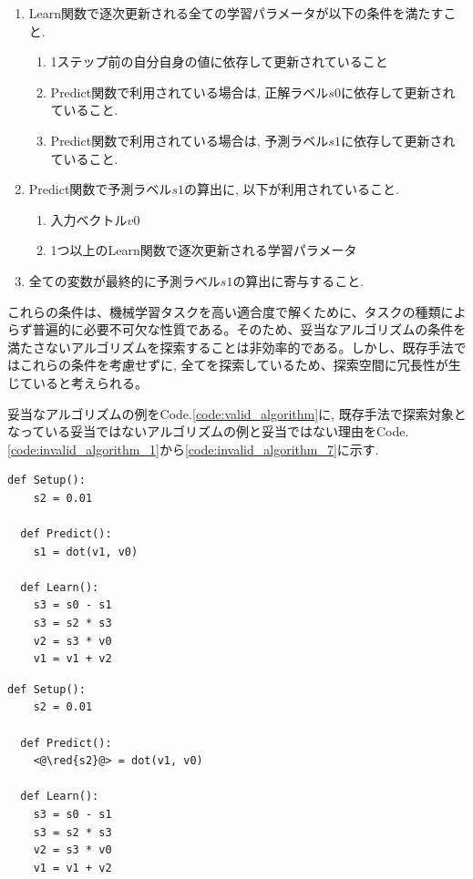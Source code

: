 \documentclass[11pt,oneside,openany,report]{jsbook}
\newcommand{\red}[1]{\textcolor{red}{#1}}
\begin{document}
\begin{enumerate}
  \item Learn関数で逐次更新される全ての学習パラメータが以下の条件を満たすこと.
  \begin{enumerate}
    \item 1ステップ前の自分自身の値に依存して更新されていること
    \item Predict関数で利用されている場合は, 正解ラベル$s0$に依存して更新されていること.
    \item Predict関数で利用されている場合は, 予測ラベル$s1$に依存して更新されていること.
  \end{enumerate}
  \item Predict関数で予測ラベル$s1$の算出に, 以下が利用されていること.
  \begin{enumerate}
    \item 入力ベクトル$v0$
    \item 1つ以上のLearn関数で逐次更新される学習パラメータ
  \end{enumerate}
  \item 全ての変数が最終的に予測ラベル$s1$の算出に寄与すること.
\end{enumerate}

これらの条件は、機械学習タスクを高い適合度で解くために、タスクの種類によらず普遍的に必要不可欠な性質である。そのため、妥当なアルゴリズムの条件を満たさないアルゴリズムを探索することは非効率的である。しかし、既存手法ではこれらの条件を考慮せずに, 全てを探索しているため、探索空間に冗長性が生じていると考えられる。

妥当なアルゴリズムの例をCode.\ref{code:valid_algorithm}に, 既存手法で探索対象となっている妥当ではないアルゴリズムの例と妥当ではない理由をCode.\ref{code:invalid_algorithm_1}から\ref{code:invalid_algorithm_7}に示す.

\newpage

\begin{multicols}{2}
  \begin{lstlisting}[caption=妥当な機械学習アルゴリズムの例,label=code:valid_algorithm]
  def Setup():
    s2 = 0.01

  def Predict():
    s1 = dot(v1, v0)

  def Learn():
    s3 = s0 - s1
    s3 = s2 * s3
    v2 = s3 * v0
    v1 = v1 + v2
  \end{lstlisting}

  \columnbreak

  \begin{lstlisting}[caption=妥当なアルゴリズムの条件4を満たさない非妥当なアルゴリズム,label=code:invalid_algorithm_1]
  def Setup():
    s2 = 0.01

  def Predict():
    <@\red{s2}@> = dot(v1, v0)

  def Learn():
    s3 = s0 - s1
    s3 = s2 * s3
    v2 = s3 * v0
    v1 = v1 + v2
\end{lstlisting}
\end{multicols}
\end{document}
